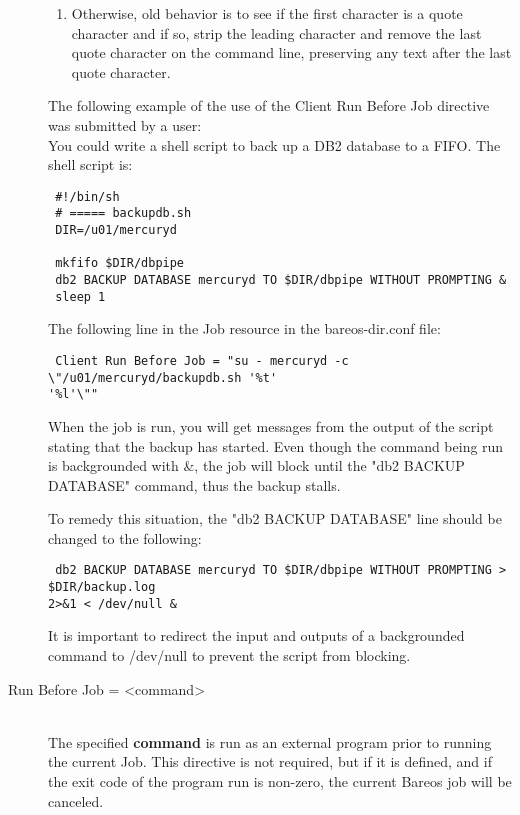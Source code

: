 \begin{description}
\begin{enumerate}
\item  Otherwise, old behavior is to see if the first character is
a quote character and if so, strip the leading character and
remove the last quote character on the command line, preserving
any text after the last quote character.
\end{enumerate}

The following example of the use of the Client Run Before Job directive was
submitted by a user:\\
You could write a shell script to back up a DB2 database to a FIFO. The shell
script is:

\footnotesize
\begin{verbatim}
 #!/bin/sh
 # ===== backupdb.sh
 DIR=/u01/mercuryd

 mkfifo $DIR/dbpipe
 db2 BACKUP DATABASE mercuryd TO $DIR/dbpipe WITHOUT PROMPTING &
 sleep 1
\end{verbatim}
\normalsize

The following line in the Job resource in the bareos-dir.conf file:
\footnotesize
\begin{verbatim}
 Client Run Before Job = "su - mercuryd -c \"/u01/mercuryd/backupdb.sh '%t'
'%l'\""
\end{verbatim}
\normalsize

When the job is run, you will get messages from the output of the script
stating that the backup has started. Even though the command being run is
backgrounded with \&, the job will block until the "db2 BACKUP DATABASE"
command, thus the backup stalls.

To remedy this situation, the "db2 BACKUP DATABASE" line should be changed to
the following:

\footnotesize
\begin{verbatim}
 db2 BACKUP DATABASE mercuryd TO $DIR/dbpipe WITHOUT PROMPTING > $DIR/backup.log
2>&1 < /dev/null &
\end{verbatim}
\normalsize

It is important to redirect the input and outputs of a backgrounded command to
/dev/null to prevent the script from blocking.

\item [Run Before Job = {\textless}command{\textgreater}] \hfill \\
The specified {\bf command} is run as an external program prior to running the
current Job.  This directive is not required, but if it is defined, and if the
exit code of the program run is non-zero, the current Bareos job will be
canceled.


\end{description}
